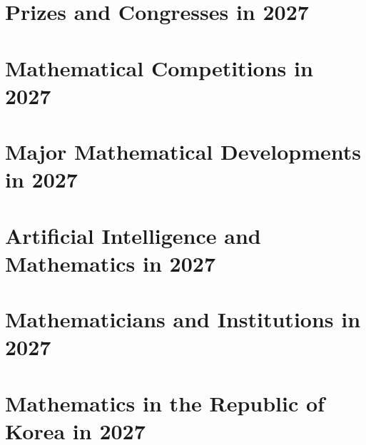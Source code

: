 \chapter{Prizes and Congresses in 2027}

\chapter{Mathematical Competitions in 2027}

\chapter{Major Mathematical Developments in 2027}

\chapter{Artificial Intelligence and Mathematics in 2027}

\chapter{Mathematicians and Institutions in 2027}

\chapter{Mathematics in the Republic of Korea in 2027}
